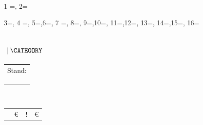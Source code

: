 
\csvreader[separator=pipe,respect all]{\kneipenCSV}
{1 =\name, 2=\address,  3=\beerprice,
	4 =\softdrinkprice,    5=\web ,6=\phone,
	7 =\food, 8=\beer,     9=\wifi,10=\cocktails,
	11=\togo,12=\smoking,  13=\smokingBan,
	14=\desc,15=\category, 16=\update
}{
	\vspace{-1.65em}
	\noindent
	\subsection*{\name \small{$~\mid \MakeUppercase\category$}}
	\vspace{-1.45em}
	\begin{minipage}{0.6\textwidth}
		\begin{tabular}{cl}
			\multicolumn{2}{l}{Stand: \update} \\
			\faMapMarker & \is{\address} \\
			\faPhone     & \is{\phone}   \\
			\faLaptop    & \isUrl{\web}
		\end{tabular}
	\end{minipage}
	\hfill
	\begin{minipage}{0.4\textwidth}
		\vspace{-1.25em}
		\features{\has{\food}}{\has{\beer}}{\has{\cocktails}}{\has{\wifi}}
		{\has{\togo}}{\has{\smoking}}{\has{\smokingBan}}\\[0.5em]
		\begin{tabular}{rlll}
			\faBeer\faEuroSign               & \beerprice\euro         %
			  & \textbf{!}\faBeer\faEuroSign & \softdrinkprice\euro \\ %
		\end{tabular}
	\end{minipage}\\[.5em]
	\desc\\
}
